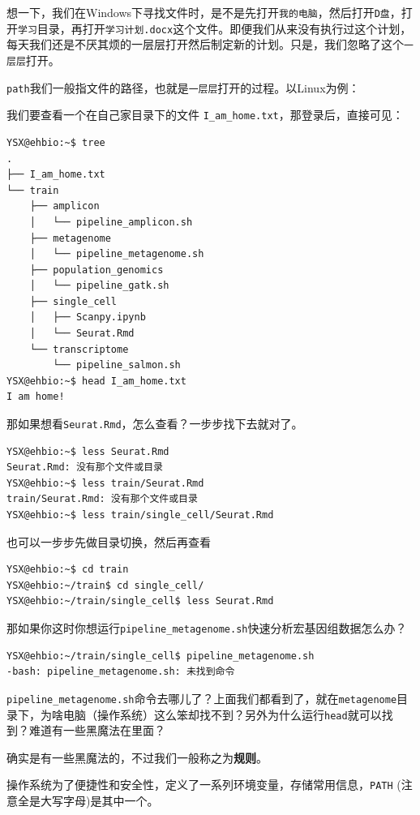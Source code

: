 \documentclass[]{article}
\numberwithin{figure}{section}
\numberwithin{table}{section}
\begin{document}
想一下，我们在Windows下寻找文件时，是不是先打开\texttt{我的电脑}，然后打开\texttt{D盘}，打开\texttt{学习}目录，再打开\texttt{学习计划.docx}这个文件。即便我们从来没有执行过这个计划，每天我们还是不厌其烦的一层层打开然后制定新的计划。只是，我们忽略了这个\texttt{一层层}打开。

\texttt{path}我们一般指文件的路径，也就是\texttt{一层层}打开的过程。以Linux为例：

我们要查看一个在自己家目录下的文件 \texttt{I\_am\_home.txt}，那登录后，直接可见：

\begin{verbatim}
YSX@ehbio:~$ tree
.
├── I_am_home.txt
└── train
    ├── amplicon
    │   └── pipeline_amplicon.sh
    ├── metagenome
    │   └── pipeline_metagenome.sh
    ├── population_genomics
    │   └── pipeline_gatk.sh
    ├── single_cell
    │   ├── Scanpy.ipynb
    │   └── Seurat.Rmd
    └── transcriptome
        └── pipeline_salmon.sh
YSX@ehbio:~$ head I_am_home.txt
I am home!
\end{verbatim}

那如果想看\texttt{Seurat.Rmd}，怎么查看？一步步找下去就对了。

\begin{verbatim}
YSX@ehbio:~$ less Seurat.Rmd
Seurat.Rmd: 没有那个文件或目录
YSX@ehbio:~$ less train/Seurat.Rmd
train/Seurat.Rmd: 没有那个文件或目录
YSX@ehbio:~$ less train/single_cell/Seurat.Rmd
\end{verbatim}

也可以一步步先做目录切换，然后再查看

\begin{verbatim}
YSX@ehbio:~$ cd train
YSX@ehbio:~/train$ cd single_cell/
YSX@ehbio:~/train/single_cell$ less Seurat.Rmd
\end{verbatim}

那如果你这时你想运行\texttt{pipeline\_metagenome.sh}快速分析宏基因组数据怎么办？

\begin{verbatim}
YSX@ehbio:~/train/single_cell$ pipeline_metagenome.sh
-bash: pipeline_metagenome.sh: 未找到命令
\end{verbatim}

\texttt{pipeline\_metagenome.sh}命令去哪儿了？上面我们都看到了，就在\texttt{metagenome}目录下，为啥电脑（操作系统）这么笨却找不到？另外为什么运行\texttt{head}就可以找到？难道有一些黑魔法在里面？

确实是有一些黑魔法的，不过我们一般称之为\textbf{规则}。

操作系统为了便捷性和安全性，定义了一系列环境变量，存储常用信息，\texttt{PATH} (注意全是大写字母)是其中一个。
\end{document}
